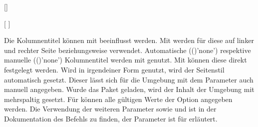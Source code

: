 \begin{Declaration*}{}
\begin{Declaration*}{}
\begin{Declaration*}{}
\begin{Declaration}{[]}
\begin{Declaration}{%
  [%
  ]%
}
\begin{Declaration}{}
\begin{Declaration}{}
\begin{Declaration}{%
}
\begin{Declaration}{%
}
\begin{Declaration}{}
\begin{Declaration}{%
}
\begin{Declaration}{}
\begin{Declaration}{}
\begin{Declaration}{}
Die Kolumnentitel können mit  
beeinflusst werden. Mit  werden 
für diese auf linker und rechter Seite  beziehungsweise
 verwendet.
Automatische (()'none') respektive 
manuelle (()'none') Kolumnentitel 
werden mit  genutzt. Mit 
 können 
diese direkt festgelegt werden. Wird  
in irgendeiner Form genutzt, wird der Seitenstil  
automatisch gesetzt. Dieser lässt sich für die Umgebung mit dem Parameter 
 auch manuell angegeben. Wurde das 
Paket  geladen, wird der Inhalt der Umgebung mit 
 mehrspaltig gesetzt. 
Für  können alle gültigen Werte der 
Option  angegeben werden. Die Verwendung der weiteren 
Parameter  sowie 
 und  ist 
in der Dokumentation des Befehls  zu finden, der Parameter 
 ist für  erläutert.
\end{Declaration}
\end{Declaration}
\end{Declaration}
\end{Declaration}
\end{Declaration}
\end{Declaration}
\end{Declaration}
\end{Declaration}
\end{Declaration}
\end{Declaration}
\end{Declaration}


\end{Declaration*}
\end{Declaration*}
\end{Declaration*}
